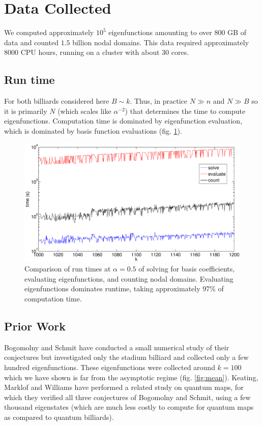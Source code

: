 \documentclass{report}
\begin{document}
\section{Data Collected}
We computed approximately $10^{5}$ eigenfunctions amounting to over $800$ GB of data and counted $1.5$ billion nodal domains. This data required approximately $8000$ CPU hours, running on a cluster with about $30$ cores.

\subsection{Run time}
For both billiards considered here $B \sim k$. Thus, in practice $N \gg n$ and $N \gg B$ so it is primarily $N$ (which scales like $\alpha^{-2}$) that determines the time to compute eigenfunctions. Computation time is dominated by eigenfunction evaluation, which is dominated by basis function evaluations (fig. \ref{fig:timing}).

\begin{figure}
  \begin{center}
    \includegraphics[width=\textwidth]{figs/timing/timing_comp_1000_to_1200.eps}
    \caption{Comparison of run times at $\alpha = 0.5$ of solving for basis coefficients, evaluating eigenfunctions, and counting nodal domains. Evaluating eigenfunctions dominates runtime, taking approximately 97\% of computation time.}
    \label{fig:timing}
  \end{center}
\end{figure}

\subsection{Prior Work}
Bogomolny and Schmit \cite{bogomolny07} have conducted a small numerical study of their conjectures but investigated only the stadium billiard and collected only a few hundred eigenfunctions. These eigenfunctions were collected around $k=100$ which we have shown is far from the asymptotic regime (fig. \ref{fig:mean}). Keating, Marklof and Williams \cite{keating} have performed a related study on quantum maps, for which they verified all three conjectures of Bogomolny and Schmit, using a few thousand eigenstates (which are much less costly to compute for quantum maps as compared to quantum billiards).
\end{document}
